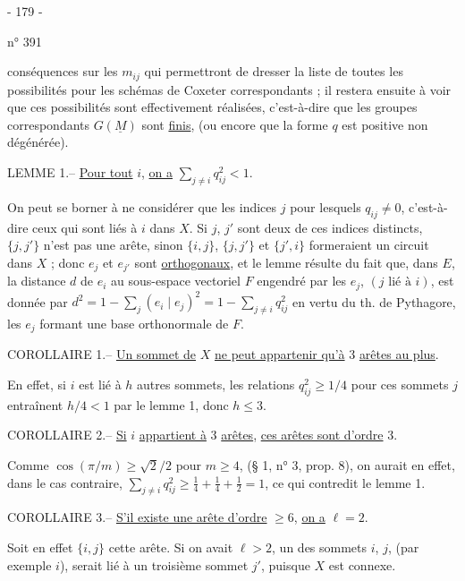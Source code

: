 \begin{center}- 179 -\end{center}
\hfill n° 391

conséquences sur les $m_{ij}$ qui permettront de dresser la liste de toutes les possibilités pour les schémas de Coxeter correspondants ; il restera ensuite à voir que ces possibilités sont effectivement réalisées, c'est-à-dire que les groupes correspondants $G(\underline M)$ sont \uline{finis}, (ou encore que la forme $q$ est positive non dégénérée).

LEMME 1.-- \uline{Pour tout} $i$, \uline{on a} $\sum_{j\ne i}q_{ij}^2<1$.

On peut se borner à ne considérer que les indices $j$ pour lesquels $q_{ij}\ne0$, c'est-à-dire ceux qui sont liés à $i$ dans $X$. Si $j$, $j'$ sont deux de ces indices distincts, $\{j,j'\}$ n'est pas une arête, sinon $\{i,j\}$, $\{j,j'\}$ et $\{j',i\}$ formeraient un circuit dans $X$ ; donc $e_j$ et $e_{j'}$ sont \uline{orthogonaux}, et le lemme résulte du fait que, dans $E$, la distance $d$ de $e_i$ au sous-espace vectoriel $F$ engendré par les $e_j$, $(j\text{ lié à }i)$, est donnée par $d^2=1-\sum_j(e_i\mid e_j)^2=1-\sum_{j\ne i}q_{ij}^2$ en vertu du th. de Pythagore, les $e_j$ formant une base orthonormale de $F$.

COROLLAIRE 1.-- \uline{Un sommet de} $X$ \uline{ne peut appartenir qu'à} 3 \uline{arêtes au plus}.

En effet, si $i$ est lié à $h$ autres sommets, les relations $q_{ij}^2\geq1/4$ pour ces sommets $j$ entraînent $h/4<1$ par le lemme 1, donc $h\leq3$.

COROLLAIRE 2.-- \uline{Si} $i$ \uline{appartient à} 3 \uline{arêtes}, \uline{ces arêtes sont d'ordre} 3.

Comme $\cos(\pi/m)\geq\sqrt2/2$ pour $m\geq4$, (§ 1, n° 3, prop. 8), on aurait en effet, dans le cas contraire, $\sum_{j\ne i}q_{ij}^2\geq\frac14+\frac14+\frac12=1$, ce qui contredit le lemme 1.

COROLLAIRE 3.-- \uline{S'il existe une arête d'ordre} $\geq6$, \uline{on a} $\ell=2$.

Soit en effet $\{i,j\}$ cette arête. Si on avait $\ell>2$, un des sommets $i$, $j$, (par exemple $i$), serait lié à un troisième sommet $j'$, puisque $X$ est connexe.
